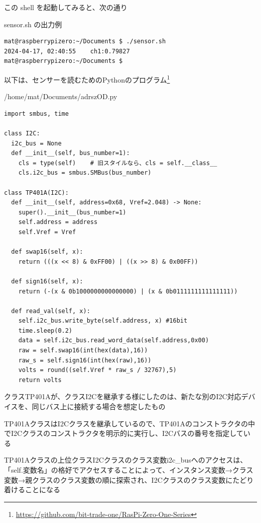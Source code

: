 \documentclass[12pt,a4paper,uplatex]{jsbook}
\begin{document}
この shell を起動してみると、次の通り

\begin{itembox}[l]{sensor.sh の出力例}
	\begin{verbatim}
mat@raspberrypizero:~/Documents $ ./sensor.sh 
2024-04-17, 02:40:55	ch1:0.79827
mat@raspberrypizero:~/Documents $ 
	\end{verbatim}
\end{itembox}

以下は、センサーを読むためのPythonのプログラム\footnote{\url{https://github.com/bit-trade-one/RasPi-Zero-One-Series}
}

\begin{spacing}{0.9}
\begin{itembox}[l]{/home/mat/Documents/adrszOD.py}
	\begin{verbatim}
import smbus, time

class I2C:
  i2c_bus = None
  def __init__(self, bus_number=1):
    cls = type(self)    # 旧スタイルなら、cls = self.__class__
    cls.i2c_bus = smbus.SMBus(bus_number) 

class TP401A(I2C):
  def __init__(self, address=0x68, Vref=2.048) -> None:
    super().__init__(bus_number=1)
    self.address = address
    self.Vref = Vref

  def swap16(self, x):
    return (((x << 8) & 0xFF00) | ((x >> 8) & 0x00FF))

  def sign16(self, x):
    return (-(x & 0b1000000000000000) | (x & 0b0111111111111111))

  def read_val(self, x):
    self.i2c_bus.write_byte(self.address, x) #16bit
    time.sleep(0.2)
    data = self.i2c_bus.read_word_data(self.address,0x00)
    raw = self.swap16(int(hex(data),16))
    raw_s = self.sign16(int(hex(raw),16))
    volts = round((self.Vref * raw_s / 32767),5)
    return volts
	\end{verbatim}
\end{itembox}
\end{spacing}

\newpage

クラスTP401Aが、クラスI2Cを継承する様にしたのは、新たな別のI2C対応デバイスを、同じバス上に接続する場合を想定したもの

TP401AクラスはI2Cクラスを継承しているので、TP401Aのコンストラクタの中でI2Cクラスのコンストラクタを明示的に実行し、I2Cバスの番号を指定している

TP401Aクラスの上位クラスI2Cクラスのクラス変数i2c\_busへのアクセスは、「self.変数名」の格好でアクセスすることによって、インスタンス変数→クラス変数→親クラスのクラス変数の順に探索され、I2Cクラスのクラス変数にたどり着けることになる
\end{document}
